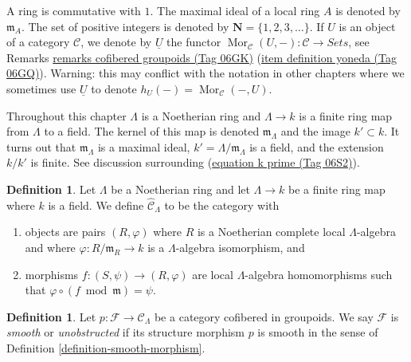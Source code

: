 \documentclass{amsart}
\theoremstyle{plain}
\theoremstyle{definition}
\newtheorem{definition}[subsection]{Definition}
\theoremstyle{remark}
\numberwithin{equation}{subsection}
\def\Mor{\mathop{\mathrm{Mor}}\nolimits}
\begin{document}
\noindent
A ring is commutative with $1$. The  maximal ideal of a local ring $A$
is denoted by $\mathfrak{m}_A$. The set of positive integers is denoted
by $\mathbf{N} = \{1, 2, 3, \ldots\}$. If $U$ is an object of a
category $\mathcal{C}$, we denote by $\underline{U}$
the functor
$\Mor_\mathcal{C}(U, -): \mathcal{C} \to \textit{Sets}$, see
Remarks \href{https://stacks.math.columbia.edu/tag/06GK}{remarks cofibered groupoids (Tag 06GK)} (\href{https://stacks.math.columbia.edu/tag/06GQ}{item definition yoneda (Tag 06GQ)}).
Warning: this may conflict with the notation in other chapters where we
sometimes use $\underline{U}$ to denote $h_U(-) = \Mor_\mathcal{C}(-, U)$.

\medskip\noindent
Throughout this chapter $\Lambda$ is a Noetherian ring and
$\Lambda \to k$ is a finite ring map from $\Lambda$ to a field.
The kernel of this map is denoted $\mathfrak m_\Lambda$ and the
image $k' \subset k$. It turns out that $\mathfrak m_\Lambda$ is
a maximal ideal, $k' = \Lambda/\mathfrak m_\Lambda$ is a field, and
the extension $k/k'$ is finite. See discussion surrounding
(\href{https://stacks.math.columbia.edu/tag/06S2}{equation k prime (Tag 06S2)}).




\begin{definition}
\label{definition-completion-CLambda}
Let $\Lambda$ be a Noetherian ring and let $\Lambda \to k$ be a finite
ring map where $k$ is a field. We define {\it $\widehat{\mathcal{C}}_\Lambda$}
to be the category with
\begin{enumerate}
\item objects are pairs $(R, \varphi)$ where $R$ is a Noetherian complete
local $\Lambda$-algebra and where $\varphi : R/\mathfrak m_R \to k$ is a
$\Lambda$-algebra isomorphism, and
\item morphisms $f : (S, \psi) \to (R, \varphi)$ are local $\Lambda$-algebra
homomorphisms such that $\varphi \circ (f \bmod \mathfrak m) = \psi$.
\end{enumerate}
\end{definition}

\begin{definition}
\label{definition-cofibered-groupoid-projection-smooth}
Let $p : \mathcal{F} \to \mathcal{C}_\Lambda$ be a category cofibered in
groupoids. We say $\mathcal{F}$ is {\it smooth} or {\it unobstructed}
if its structure morphism $p$ is smooth
in the sense of Definition \ref{definition-smooth-morphism}.
\end{definition}
\end{document}
